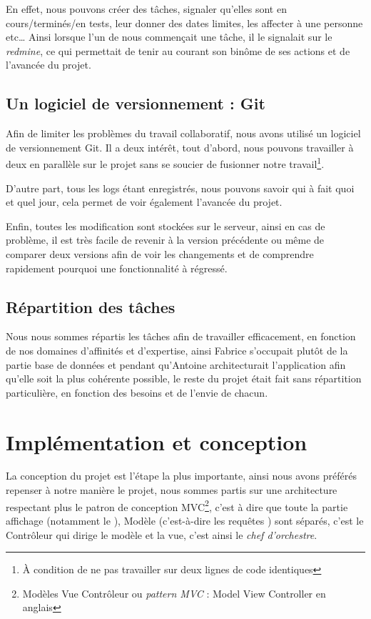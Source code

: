 \documentclass[12pt,a4paper,openany]{book}
\begin{document}
	En effet, nous pouvons créer des tâches, signaler qu'elles sont en cours/terminés/en tests, leur donner des dates limites, les affecter à une personne etc\ldots
	Ainsi lorsque l'un de nous commençait une tâche, il le signalait sur le \textit{redmine}, ce qui permettait de tenir au courant son binôme de ses actions et
	de l'avancée du projet.

	\section{Un logiciel de versionnement : Git}
	Afin de limiter les problèmes du travail collaboratif, nous avons utilisé un logiciel de versionnement Git. Il a deux intérêt, tout d'abord, nous pouvons
	travailler à deux en parallèle sur le projet sans se soucier de fusionner notre travail\footnote{À condition de ne pas travailler sur deux lignes de code
	identiques}.

	D'autre part, tous les logs étant enregistrés, nous pouvons savoir qui à fait quoi et quel jour, cela permet de voir également l'avancée du projet. 

	Enfin, toutes les modification sont stockées sur le serveur, ainsi en cas de problème, il est très facile de revenir à la version précédente ou même de
	comparer deux versions afin de voir les changements et de comprendre rapidement pourquoi une fonctionnalité à régressé. 

	\section{Répartition des tâches}
	Nous nous sommes répartis les tâches afin de travailler efficacement, en fonction de nos domaines d'affinités et d'expertise, ainsi Fabrice s'occupait
	plutôt de la partie base de données et  pendant qu'Antoine architecturait l'application afin qu'elle soit la plus cohérente possible, le reste du projet
	était fait sans répartition particulière, en fonction des besoins et de l'envie de chacun.

	\chapter{Implémentation et conception}
		La conception du projet est l'étape la plus importante, ainsi nous avons préférés repenser à notre manière le projet, 
		nous sommes partis sur une architecture respectant plus le patron de conception MVC\footnote{Modèles Vue Contrôleur ou
		\textit{pattern MVC} : Model View Controller en anglais}, c'est à
		dire que toute la partie affichage (notamment le ), Modèle (c'est-à-dire les requêtes ) sont séparés, c'est le Contrôleur qui dirige le
		modèle et la vue, c'est ainsi le \textit{chef d'orchestre}.
\end{document}
